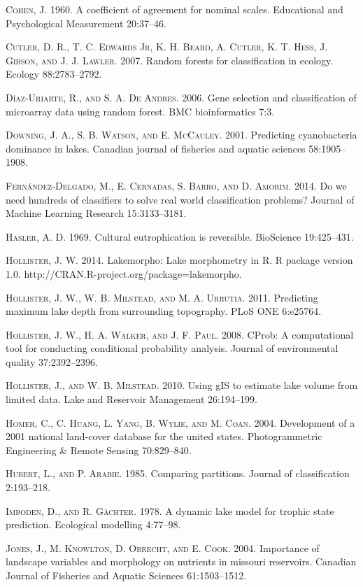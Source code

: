 \documentclass[11pt,]{article}
\begin{document}
\textsc{Cohen, J.} 1960. A coefficient of agreement for nominal scales.
Educational and Psychological Measurement 20:37--46.

\textsc{Cutler, D. R., T. C. Edwards Jr, K. H. Beard, A. Cutler, K. T.
Hess, J. Gibson, and J. J. Lawler}. 2007. Random forests for
classification in ecology. Ecology 88:2783--2792.

\textsc{D{í}az-Uriarte, R., and S. A. De Andres}. 2006. Gene selection
and classification of microarray data using random forest. BMC
bioinformatics 7:3.

\textsc{Downing, J. A., S. B. Watson, and E. McCauley}. 2001. Predicting
cyanobacteria dominance in lakes. Canadian journal of fisheries and
aquatic sciences 58:1905--1908.

\textsc{Fernández-Delgado, M., E. Cernadas, S. Barro, and D. Amorim}.
2014. Do we need hundreds of classifiers to solve real world
classification problems? Journal of Machine Learning Research
15:3133--3181.

\textsc{Hasler, A. D.} 1969. Cultural eutrophication is reversible.
BioScience 19:425--431.

\textsc{Hollister, J. W.} 2014. Lakemorpho: Lake morphometry in R. R
package version 1.0. http://CRAN.R-project.org/package=lakemorpho.

\textsc{Hollister, J. W., W. B. Milstead, and M. A. Urrutia}. 2011.
Predicting maximum lake depth from surrounding topography. PLoS ONE
6:e25764.

\textsc{Hollister, J. W., H. A. Walker, and J. F. Paul}. 2008. CProb: A
computational tool for conducting conditional probability analysis.
Journal of environmental quality 37:2392--2396.

\textsc{Hollister, J., and W. B. Milstead}. 2010. Using gIS to estimate
lake volume from limited data. Lake and Reservoir Management
26:194--199.

\textsc{Homer, C., C. Huang, L. Yang, B. Wylie, and M. Coan}. 2004.
Development of a 2001 national land-cover database for the united
states. Photogrammetric Engineering \& Remote Sensing 70:829--840.

\textsc{Hubert, L., and P. Arabie}. 1985. Comparing partitions. Journal
of classification 2:193--218.

\textsc{Imboden, D., and R. G{ä}chter}. 1978. A dynamic lake model for
trophic state prediction. Ecological modelling 4:77--98.

\textsc{Jones, J., M. Knowlton, D. Obrecht, and E. Cook}. 2004.
Importance of landscape variables and morphology on nutrients in
missouri reservoirs. Canadian Journal of Fisheries and Aquatic Sciences
61:1503--1512.
\end{document}
